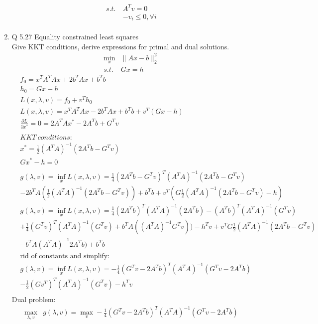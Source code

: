 \documentclass[12pt,letter]{article}
\newcommand{\norm}[1]{\|#1\|}
\begin{document}
\begin{enumerate}
\begin{align*}
    s.t.\ &A^Tv = 0\\
    &-v_i \leq 0, \forall i\\
  \end{align*}
  \pagebreak
\item Q 5.27 Equality constrained least squares\\
  Give KKT conditions, derive expressions for primal and dual solutions.
  \begin{align*}
    \min_x & \norm{Ax-b}_2^2\\
    s.t.\ & Gx=h            
  \end{align*}
  \begin{align*}
    &f_0 = x^TA^TAx + 2b^TAx + b^Tb\\
    &h_0 = Gx-h\\
    &L(x,\lambda,v) = f_0 + v^Th_0\\
    &L(x,\lambda,v) = x^TA^TAx - 2b^TAx + b^Tb + v^T(Gx-h)\\
    &\frac{\partial L}{\partial x^*} = 0 = 2A^TAx^* - 2A^Tb + G^Tv\\
    \\
    &KKT\ conditions:\\
    &x^* = \frac{1}{2}(A^TA)^{-1}(2A^Tb - G^Tv)\\
    &Gx^*-h = 0\\
    \\
    &g(\lambda,v)= \inf_x L(x,\lambda,v) = \frac{1}{4}(2A^Tb-G^Tv)^T(A^TA)^{-1}(2A^Tb-G^Tv)\\
    &-2b^TA(\frac{1}{2}(A^TA)^{-1}(2A^Tb-G^Tv)) + b^Tb + v^T(G\frac{1}{2}(A^TA)^{-1}(2A^Tb-G^Tv)-h)\\
    &g(\lambda,v)= \inf_x L(x,\lambda,v) = \frac{1}{4}(2A^Tb)^T(A^TA)^{-1}(2A^Tb)-(A^Tb)^T(A^TA)^{-1}(G^Tv)\\
    &+\frac{1}{4}(G^Tv)^T(A^TA)^{-1}(G^Tv) +b^TA((A^TA)^{-1}G^Tv)) -h^Tv + v^TG\frac{1}{2}(A^TA)^{-1}(2A^Tb-G^Tv) \\
    &- b^TA(A^TA)^{-1}2A^Tb) + b^Tb\\
    &\text{rid of constants and simplify}:\\
    &g(\lambda,v)= \inf_x L(x,\lambda,v) = -\frac{1}{4}(G^Tv-2A^Tb)^T(A^TA)^{-1}(G^Tv-2A^Tb) \\
    &-\frac{1}{2}(Gv^T)^T(A^TA)^{-1}(G^Tv) -h^Tv\\
  \end{align*}
  Dual problem:
  \begin{align*}
    \max_{\lambda,v} & g(\lambda,v) = \max_v -\frac{1}{4}(G^Tv-2A^Tb)^T(A^TA)^{-1}(G^Tv-2A^Tb) \\

\end{align*}
\end{enumerate}
\end{document}
